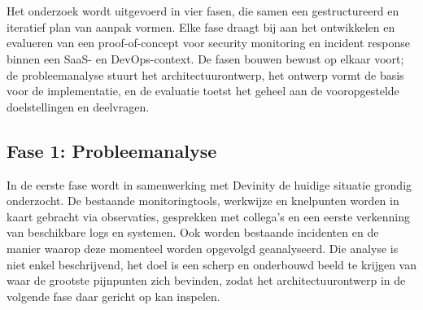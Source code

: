 
\chapter{}%
\label{ch:methodologie}


Het onderzoek wordt uitgevoerd in vier fasen, die samen een gestructureerd en iteratief plan van aanpak vormen. Elke fase draagt bij aan het ontwikkelen en evalueren van een proof-of-concept voor security monitoring en incident response binnen een SaaS- en DevOps-context. De fasen bouwen bewust op elkaar voort; de probleemanalyse stuurt het architectuurontwerp, het ontwerp vormt de basis voor de implementatie, en de evaluatie toetst het geheel aan de vooropgestelde doelstellingen en deelvragen.

\section{Fase 1: Probleemanalyse}
In de eerste fase wordt in samenwerking met Devinity de huidige situatie grondig onderzocht. De bestaande monitoringtools, werkwijze en knelpunten worden in kaart gebracht via observaties, gesprekken met collega's en een eerste verkenning van beschikbare logs en systemen. Ook worden bestaande incidenten en de manier waarop deze momenteel worden opgevolgd geanalyseerd. Die analyse is niet enkel beschrijvend, het doel is een scherp en onderbouwd beeld te krijgen van waar de grootste pijnpunten zich bevinden, zodat het architectuurontwerp in de volgende fase daar gericht op kan inspelen.

